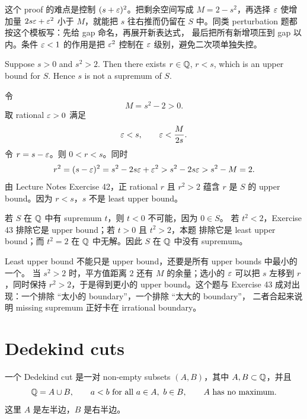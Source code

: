 \begin{explanation}
这个 proof 的难点是控制 \((s+\varepsilon)^2\)。把剩余空间写成 \(M=2-s^2\)，再选择
\(\varepsilon\) 使增加量 \(2s\varepsilon+\varepsilon^2\) 小于 \(M\)，就能把 \(s\) 往右推而仍留在
\(S\) 中。同类 perturbation 题都按这个模板写：先给 gap 命名，再展开新表达式，
最后把所有新增项压到 gap 以内。条件 \(\varepsilon<1\) 的作用是把 \(\varepsilon^2\) 控制在
\(\varepsilon\) 级别，避免二次项单独失控。
\end{explanation}

\begin{exerciseblock}
Suppose \(s>0\) and \(s^2>2\). Then there exists \(r\in\mathbb{Q}\), \(r<s\), which
is an upper bound for \(S\). Hence \(s\) is not a supremum of \(S\).
\end{exerciseblock}

\begin{solution}
令
\[
  M=s^2-2>0.
\]
取 rational \(\varepsilon>0\) 满足
\[
  \varepsilon<s,\qquad \varepsilon<\frac{M}{2s}.
\]
令 \(r=s-\varepsilon\)。则 \(0<r<s\)。同时
\[
  r^2=(s-\varepsilon)^2=s^2-2s\varepsilon+\varepsilon^2
      >s^2-2s\varepsilon
      >s^2-M=2.
\]
由 Lecture Notes Exercise 42，正 rational \(r\) 且 \(r^2>2\) 蕴含 \(r\) 是
\(S\) 的 upper bound。因为 \(r<s\)，\(s\) 不是 least upper bound。

若 \(S\) 在 \(\mathbb{Q}\) 中有 supremum \(t\)，则 \(t<0\) 不可能，因为 \(0\in S\)。
若 \(t^2<2\)，Exercise 43 排除它是 upper bound；若 \(t>0\) 且 \(t^2>2\)，本题
排除它是 least upper bound；而 \(t^2=2\) 在 \(\mathbb{Q}\) 中无解。因此 \(S\) 在 \(\mathbb{Q}\)
中没有 supremum。
\end{solution}

\begin{explanation}
Least upper bound 不能只是 upper bound，还要是所有 upper bounds 中最小的一个。
当 \(s^2>2\) 时，平方值距离 \(2\) 还有 \(M\) 的余量；选小的 \(\varepsilon\) 可以把
\(s\) 左移到 \(r\)，同时保持 \(r^2>2\)，于是得到更小的 upper bound。这个题与
Exercise 43 成对出现：一个排除 ``太小的 boundary''，一个排除 ``太大的 boundary''，
二者合起来说明 missing supremum 正好卡在 irrational boundary。
\end{explanation}

\section{Dedekind cuts}

\begin{definition}
一个 Dedekind cut 是一对 non-empty subsets \((A,B)\)，其中 \(A,B\subset\mathbb{Q}\)，并且
\[
  \mathbb{Q}=A\cup B,\qquad
  a<b\text{ for all }a\in A,\ b\in B,\qquad
  A\text{ has no maximum}.
\]
这里 \(A\) 是左半边，\(B\) 是右半边。
\end{definition}

